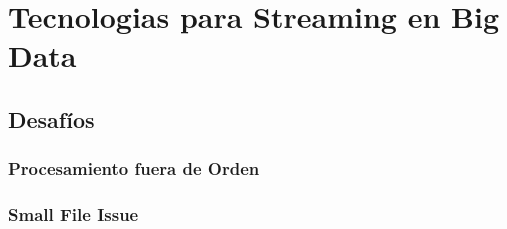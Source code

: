 \section{Tecnologias para Streaming en Big Data}





\subsection{Desafíos}
\subsubsection{Procesamiento fuera de Orden}
\subsubsection{Small File Issue}